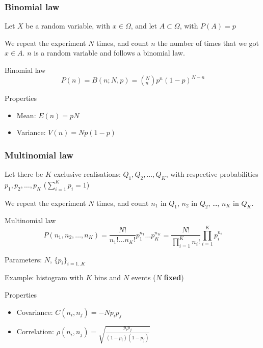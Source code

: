 \documentclass[9pt]{beamer}
\newif\ifmynote
\newcommand\mynote[1]{%
\ifmynote \textbf{#1} \else \fi
}
\begin{document}
\begin{frame}
 \frametitle{Binomial law}
 
 \mynote{Écrire au tableau}
 
 Let $X$ be a random variable, with $x \in \Omega$, and let $A \subset \Omega$, with $P(A) = p$
 
 We repeat the experiment $N$ times, and count $n$ the number of times that we got $x \in A$. $n$ is a random variable and follows a binomial law.
 
 \begin{block}{Binomial law}
  $$P(n) = B(n;N,p) = \left( ^N_n \right) p^n (1-p)^{N-n}$$
 \end{block}
 
 \begin{block}{Properties}
  \begin{itemize}
   \item Mean: $E(n) = pN$
   \item Variance: $V(n) = N p (1-p)$
  \end{itemize}
 \end{block}

\end{frame}

\begin{frame}
 \frametitle{Multinomial law}
 
 \mynote{Écrire au tableau}
 
 Let there be $K$ exclusive realisations: $Q_1, Q_2, \dots, Q_K$, with respective probabilities $p_1, p_2, \dots, p_K$ ($\sum_{i=1}^K p_i = 1$)
 
 We repeat the experiment $N$ times, and count $n_1$ in $Q_1$, $n_2$ in $Q_2$, \dots, $n_K$ in $Q_K$.
 
 \begin{block}{Multinomial law}
  $$P(n_1,n_2,\dots,n_K) = \frac{N!}{n_1! \dots n_K!} p_1^{n_1} \dots p_K^{n_K} = \frac{N!}{\prod_{i=1}^{K} n_i!} \prod_{i=1}^K p_i^{n_i}$$
  
  Parameters: $N$, $\{p_i\}_{i=1..K}$
 \end{block}
 
 Example: histogram with $K$ bins and $N$ events ($N$ \textbf{fixed})

 \begin{block}{Properties}
  \begin{itemize}
   \item Covariance: $C(n_i,n_j) = -N p_i p_j$
   \item Correlation: $\rho (n_i,n_j) = \sqrt{\frac{p_i p_j}{(1-p_i)(1-p_j)}}$
  \end{itemize}
 \end{block}

\end{frame}
\end{document}
